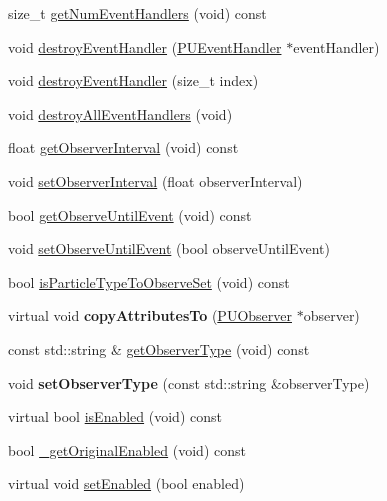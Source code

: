 \begin{DoxyCompactItemize}
\item 
size\+\_\+t \hyperlink{classPUObserver_af173b2134fc4b4d2eae639cff104fe02}{get\+Num\+Event\+Handlers} (void) const
\item 
void \hyperlink{classPUObserver_ab9a8d586068cc43f9eed0a3440448bbc}{destroy\+Event\+Handler} (\hyperlink{classPUEventHandler}{P\+U\+Event\+Handler} $\ast$event\+Handler)
\item 
void \hyperlink{classPUObserver_a8470070593a74e4b940cf02550193c27}{destroy\+Event\+Handler} (size\+\_\+t index)
\item 
void \hyperlink{classPUObserver_a8fd1d6c0034cc9ff650718e3a3c667f3}{destroy\+All\+Event\+Handlers} (void)
\item 
float \hyperlink{classPUObserver_aeff68820bc2e27913c0b1f8bc18753d0}{get\+Observer\+Interval} (void) const
\item 
void \hyperlink{classPUObserver_a8346c5d59ec8435e8d17dfc317ae4b90}{set\+Observer\+Interval} (float observer\+Interval)
\item 
bool \hyperlink{classPUObserver_a7d44e67979d599d99333e20c2faa73f0}{get\+Observe\+Until\+Event} (void) const
\item 
void \hyperlink{classPUObserver_a798f63e99e51477fd10b70167d0ddf4a}{set\+Observe\+Until\+Event} (bool observe\+Until\+Event)
\item 
bool \hyperlink{classPUObserver_a50f62938d95ab7c7f2028d889bdc56ca}{is\+Particle\+Type\+To\+Observe\+Set} (void) const
\item 
\mbox{\label{classPUObserver_af4c3e4d1d694721b3027854a8bec97a9}} 
virtual void {\bfseries copy\+Attributes\+To} (\hyperlink{classPUObserver}{P\+U\+Observer} $\ast$observer)
\item 
const std\+::string \& \hyperlink{classPUObserver_ada77c2db2e1e1d40237d41fcca481361}{get\+Observer\+Type} (void) const
\item 
\mbox{\label{classPUObserver_a18658c09249599dd36749e09c63e9d1e}} 
void {\bfseries set\+Observer\+Type} (const std\+::string \&observer\+Type)
\item 
virtual bool \hyperlink{classPUObserver_a33670aead4140f1a00691754e4dafdf0}{is\+Enabled} (void) const
\item 
bool \hyperlink{classPUObserver_a380858d42cdfa11c854f91bfef9d8395}{\+\_\+get\+Original\+Enabled} (void) const
\item 
virtual void \hyperlink{classPUObserver_abb0f7240f433f41756e28ed4db707b1e}{set\+Enabled} (bool enabled)

\end{DoxyCompactItemize}
